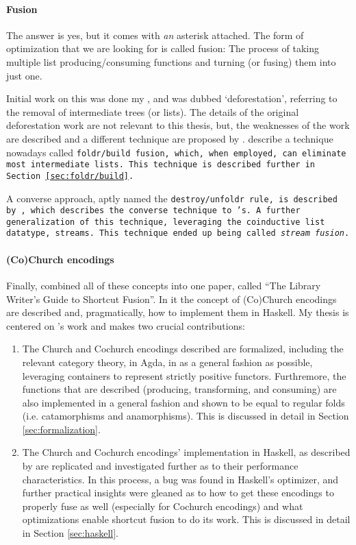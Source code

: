 \paragraph{Fusion}
The answer is yes{\Large*}, but it comes with \textit{an} asterisk attached.
The form of optimization that we are looking for is called fusion:
The process of taking multiple list producing/consuming functions and turning (or fusing) them into just one.

Initial work on this was done my \cite{Wadler1984,Wadler1986,Wadler1990}, and was dubbed `deforestation', referring to the removal of intermediate trees (or lists).
The details of the original deforestation work are not relevant to this thesis, but, the weaknesses of the work are described and a different technique are proposed by \cite{Gill1993}.
\cite{Gill1993} describe a technique nowadays called \tt{foldr/build} fusion, which, when employed, can eliminate most intermediate lists.
This technique is described further in Section \ref{sec:foldr/build}.

A converse approach, aptly named the \tt{destroy/unfoldr} rule, is described by \cite{Svenningsson2002}, which describes the converse technique to \cite{Gill1993}'s.
A further generalization of this technique, leveraging the coinductive list datatype, streams. This technique ended up being called \textit{stream fusion}.

\paragraph{(Co)Church encodings}
Finally, \cite{Harper2011} combined all of these concepts into one paper, called ``The Library Writer's Guide to Shortcut Fusion''. In it the concept of (Co)Church encodings are described and, pragmatically, how to implement them in Haskell.
My thesis is centered on \cite{Harper2011}'s work and makes two crucial contributions:
\begin{enumerate}
    \item The Church and Cochurch encodings described are formalized, including the relevant category theory, in Agda, in as a general fashion as possible, leveraging containers \citep{Abbott2005} to represent strictly positive functors.
    Furthremore, the functions that are described (producing, transforming, and consuming) are also implemented in a general fashion and shown to be equal to regular folds (i.e. catamorphisms and anamorphisms).
    This is discussed in detail in Section \ref{sec:formalization}.
    \item The Church and Cochurch encodings' implementation in Haskell, as described by \cite{Harper2011} are replicated and investigated further as to their performance characteristics.
    In this process, a bug was found in Haskell's optimizer, and further practical insights were gleaned as to how to get these encodings to properly fuse as well (especially for Cochurch encodings) and what optimizations enable shortcut fusion to do its work.
    This is discussed in detail in Section \ref{sec:haskell}.
\end{enumerate}



